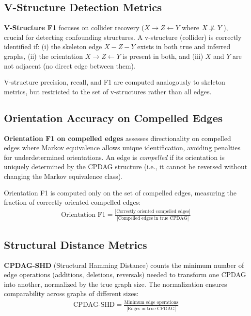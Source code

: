 \documentclass[runningheads]{llncs}
\begin{document}
\subsection{V-Structure Detection Metrics}

\textbf{V-Structure F1} focuses on collider recovery ($X \rightarrow Z \leftarrow Y$ where $X \not\!\perp\!\!\!\perp Y$), crucial for detecting confounding structures. A v-structure (collider) is correctly identified if: (i) the skeleton edge $X-Z-Y$ exists in both true and inferred graphs, (ii) the orientation $X \rightarrow Z \leftarrow Y$ is present in both, and (iii) $X$ and $Y$ are not adjacent (no direct edge between them).

V-structure precision, recall, and F1 are computed analogously to skeleton metrics, but restricted to the set of v-structures rather than all edges.

\subsection{Orientation Accuracy on Compelled Edges}

\textbf{Orientation F1 on compelled edges} assesses directionality on compelled edges where Markov equivalence allows unique identification, avoiding penalties for underdetermined orientations. An edge is \emph{compelled} if its orientation is uniquely determined by the CPDAG structure (i.e., it cannot be reversed without changing the Markov equivalence class). 

Orientation F1 is computed only on the set of compelled edges, measuring the fraction of correctly oriented compelled edges:
\begin{align}
\text{Orientation F1} = \frac{|\text{Correctly oriented compelled edges}|}{|\text{Compelled edges in true CPDAG}|}
\end{align}

\subsection{Structural Distance Metrics}

\textbf{CPDAG-SHD} (Structural Hamming Distance) counts the minimum number of edge operations (additions, deletions, reversals) needed to transform one CPDAG into another, normalized by the true graph size. The normalization ensures comparability across graphs of different sizes:
\begin{align}
\text{CPDAG-SHD} = \frac{\text{Minimum edge operations}}{|\text{Edges in true CPDAG}|}
\end{align}
\end{document}
